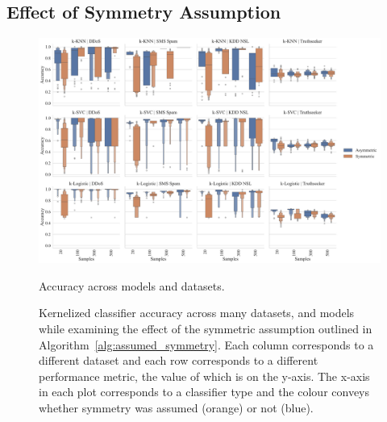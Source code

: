 \documentclass[conference]{IEEEtran}
\begin{document}
\subsection{Effect of Symmetry Assumption}



\begin{figure}[t]
    \centering
    \includegraphics[width=\textwidth]{figs/combined/symmetric_models_vs_accuracy.pdf}
    \caption{Accuracy across models and datasets.}
    \label{fig:symm_acc}
    \caption{Kernelized classifier accuracy across many datasets, and models while examining the effect of the symmetric assumption outlined in Algorithm~\ref{alg:assumed_symmetry}. Each column corresponds to a different dataset and each row corresponds to a different performance metric, the value of which is on the y-axis. The x-axis in each plot corresponds to a classifier type and the colour conveys whether symmetry was assumed (orange) or not (blue).}
    \label{fig:symm_summary}
\end{figure}
\end{document}
